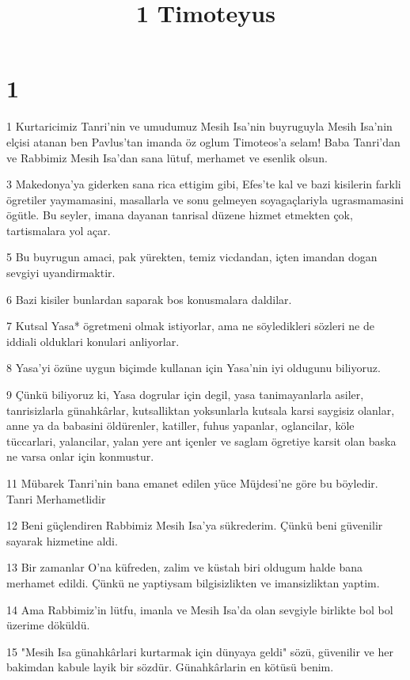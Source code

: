 

\title{1 Timoteyus}


\chapter{1}

\par 1 Kurtaricimiz Tanri'nin ve umudumuz Mesih Isa'nin buyruguyla Mesih Isa'nin elçisi atanan ben Pavlus'tan imanda öz oglum Timoteos'a selam! Baba Tanri'dan ve Rabbimiz Mesih Isa'dan sana lütuf, merhamet ve esenlik olsun.
\par 3 Makedonya'ya giderken sana rica ettigim gibi, Efes'te kal ve bazi kisilerin farkli ögretiler yaymamasini, masallarla ve sonu gelmeyen soyagaçlariyla ugrasmamasini ögütle. Bu seyler, imana dayanan tanrisal düzene hizmet etmekten çok, tartismalara yol açar.
\par 5 Bu buyrugun amaci, pak yürekten, temiz vicdandan, içten imandan dogan sevgiyi uyandirmaktir.
\par 6 Bazi kisiler bunlardan saparak bos konusmalara daldilar.
\par 7 Kutsal Yasa* ögretmeni olmak istiyorlar, ama ne söyledikleri sözleri ne de iddiali olduklari konulari anliyorlar.
\par 8 Yasa'yi özüne uygun biçimde kullanan için Yasa'nin iyi oldugunu biliyoruz.
\par 9 Çünkü biliyoruz ki, Yasa dogrular için degil, yasa tanimayanlarla asiler, tanrisizlarla günahkârlar, kutsalliktan yoksunlarla kutsala karsi saygisiz olanlar, anne ya da babasini öldürenler, katiller, fuhus yapanlar, oglancilar, köle tüccarlari, yalancilar, yalan yere ant içenler ve saglam ögretiye karsit olan baska ne varsa onlar için konmustur.
\par 11 Mübarek Tanri'nin bana emanet edilen yüce Müjdesi'ne göre bu böyledir. Tanri Merhametlidir
\par 12 Beni güçlendiren Rabbimiz Mesih Isa'ya sükrederim. Çünkü beni güvenilir sayarak hizmetine aldi.
\par 13 Bir zamanlar O'na küfreden, zalim ve küstah biri oldugum halde bana merhamet edildi. Çünkü ne yaptiysam bilgisizlikten ve imansizliktan yaptim.
\par 14 Ama Rabbimiz'in lütfu, imanla ve Mesih Isa'da olan sevgiyle birlikte bol bol üzerime döküldü.
\par 15 "Mesih Isa günahkârlari kurtarmak için dünyaya geldi" sözü, güvenilir ve her bakimdan kabule layik bir sözdür. Günahkârlarin en kötüsü benim.
